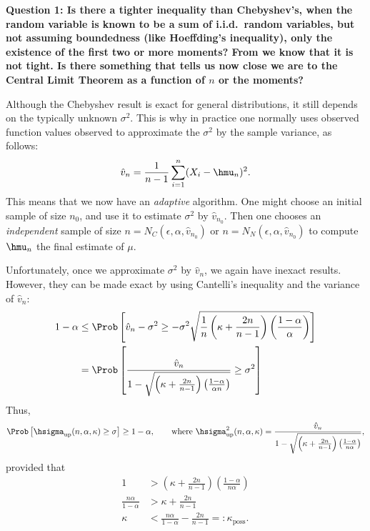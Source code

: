 \documentclass[12pt]{amsart}
\newcommand{\hv}{\hat{v}}
\begin{document}
{\bf Question 1:  Is there a tighter inequality than Chebyshev's, when the random variable is known to be a sum of i.i.d.\ random variables, but not assuming boundedness (like Hoeffding's inequality), only the existence of the first two or more moments?  From \cite{GhoMee77a} we know that it is not tight.  Is there something that tells us now close we are to the Central Limit Theorem as a function of $n$ or the moments?}

Although the Chebyshev result is exact for general distributions, it still depends on the typically unknown $\sigma^2$.  This is why in practice one normally uses observed function values observed to approximate the $\sigma^2$ by the sample variance, as follows:
\begin{equation} \label{samplevar}
\hv_{n} = \frac 1{n-1} \sum_{i=1}^{n} (X_i- \hmu_{n})^2.
\end{equation}
This means that we now have an \emph{adaptive} algorithm.  One might choose an initial sample of size $n_0$, and use it to estimate $\sigma^2$ by $\hv_{n_0}$.  Then one chooses an \emph{independent} sample of size $n=N_{C}(\epsilon,\alpha,\hv_{n_0})$ or $n=N_{N}(\epsilon,\alpha,\hv_{n_0})$ to compute $\hmu_n$ the final estimate of $\mu$.

Unfortunately, once we approximate $\sigma^2$ by $\hv_n$, we again have inexact results.  However, they can be made exact by using Cantelli's inequality and the variance of $\hv_n$:
\begin{align*}
1-\alpha & \le \Prob\left[\hv_n-\sigma^2 \ge - \sigma^2 \sqrt{\frac 1n \left ( \kappa  + \frac{2n}{n-1}\right)\left(\frac{1-\alpha}{\alpha}\right)} \right] \\
&= \Prob\left[\frac{\hv_n}{1 - \sqrt{\left ( \kappa  + \frac{2n}{n-1}\right)\left(\frac{1-\alpha}{\alpha n}\right)}} \ge \sigma^2 \right]
\end{align*}
Thus,
\begin{equation} \label{probvarupbd}
\Prob\left[\hsigma_{\text{up}}(n,\alpha,\kappa)  \ge \sigma \right] \ge 1 - \alpha, \qquad \text{where } \hsigma^2_{\text{up}}(n,\alpha,\kappa) = \frac{\hv_{n}}{1 - \sqrt{ \left ( \kappa  + \frac{2n}{n-1}\right)\left(\frac{1-\alpha}{n \alpha}\right)}},
\end{equation}
provided that 
\begin{align*}
1 &> \left ( \kappa  + \frac{2n}{n-1}\right)\left(\frac{1-\alpha}{n \alpha}\right)\\
\frac{n \alpha}{1-\alpha} & > \kappa  + \frac{2n}{n-1} \\
\kappa & < \frac{n \alpha}{1-\alpha} - \frac{2n}{n-1} =: \kappa_{\text{poss}}.
\end{align*}
\end{document}

